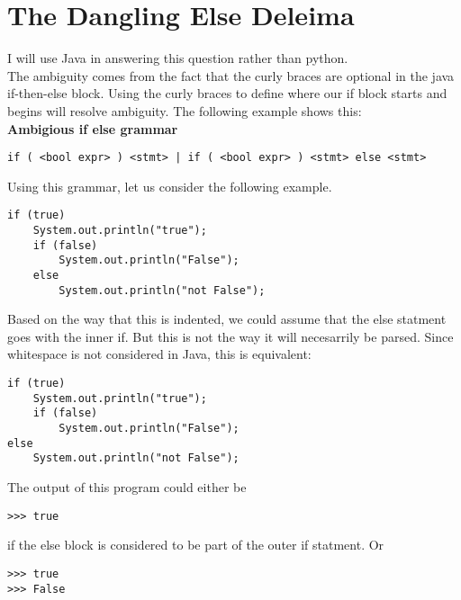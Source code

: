 \documentclass[11pt]{article}
\begin{document}
\newpage
\section{The Dangling Else Deleima}
I will use Java in answering this question rather than python.\\
The ambiguity comes from the fact that the curly braces are optional in the
java if-then-else block.  Using the curly braces to define where our if block
starts and begins will resolve ambiguity.  The following example shows this:\\


\textbf{Ambigious if else grammar}
\begin{lstlisting}[style=MyC++]
if ( <bool expr> ) <stmt> | if ( <bool expr> ) <stmt> else <stmt>
\end{lstlisting}



Using this grammar, let us consider the following example.\\

\begin{lstlisting}[style=MyC++]
if (true)
    System.out.println("true");
    if (false)
        System.out.println("False");
    else
        System.out.println("not False");
\end{lstlisting}



Based on the way that this is indented, we could assume that the else statment
goes with the inner if.  But this is not the way it will necesarrily be parsed.
Since whitespace is not considered in Java, this is equivalent:\\

\begin{lstlisting}[style=MyC++]
if (true)
    System.out.println("true");
    if (false)
        System.out.println("False");
else
    System.out.println("not False");
\end{lstlisting}


The output of this program could either be\\

\begin{lstlisting}
>>> true
\end{lstlisting}


if the else block is considered to be part of the outer if statment.  Or\\

\begin{lstlisting}
>>> true
>>> False
\end{lstlisting}
\end{document}
